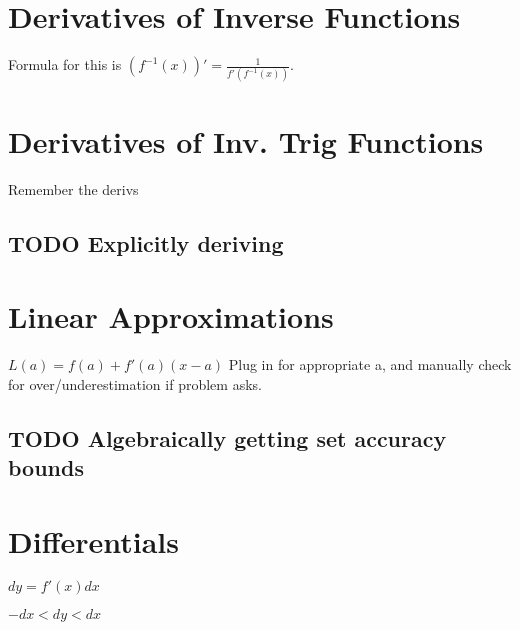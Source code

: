 \documentclass[letterpaper]{article}
\begin{document}
\section{Derivatives of Inverse Functions}
\label{sec:org28d2f7a}
Formula for this is \((f^{-1}(x))' = \frac{1}{f'(f^{-1}(x))}\). 

\section{Derivatives of Inv. Trig Functions}
\label{sec:orge96254f}
Remember the derivs

\subsection{{\bfseries\sffamily TODO} Explicitly deriving}
\label{sec:orgbc4aad1}

\section{Linear Approximations}
\label{sec:orgdab888a}
\(L(a) = f(a) + f'(a)(x-a)\)
Plug in for appropriate a, and manually check for over/underestimation if problem asks.

\subsection{{\bfseries\sffamily TODO} Algebraically getting set accuracy bounds}
\label{sec:org0447746}

\section{Differentials}
\label{sec:orgd3d0784}
\(dy = f'(x)dx\)

\(-dx < dy < dx\)
\end{document}
